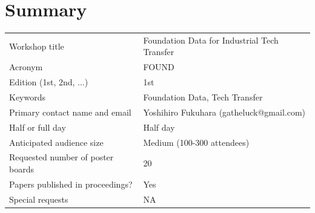 \documentclass{article}
\begin{document}
\section{Summary}
\begin{tabular}{ll}
  \hline
  Workshop title & Foundation Data for Industrial Tech Transfer \\
  Acronym & FOUND \\
  Edition (1st, 2nd, ...) & 1st \\
  Keywords & Foundation Data, Tech Transfer \\
  Primary contact name and email & Yoshihiro Fukuhara (gatheluck@gmail.com)\\
  Half or full day & Half day \\
  Anticipated audience size & Medium (100-300 attendees) \\
  Requested number of poster boards & 20 \\
  Papers published in proceedings? & Yes \\
  Special requests & NA \\
  \hline
\end{tabular}
\end{document}
